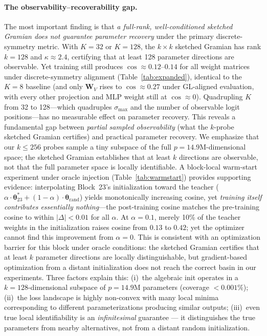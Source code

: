 \documentclass{article}
\newcommand{\btheta}{\boldsymbol{\theta}}
\newcommand{\bW}{\mathbf{W}}
\begin{document}
\paragraph{The observability--recoverability gap.}
The most important finding is that \emph{a full-rank, well-conditioned sketched Gramian does not guarantee parameter recovery} under the primary discrete-symmetry metric.  With $K{=}32$ or $K{=}128$, the $k \times k$ sketched Gramian has rank $k{=}128$ and $\kappa \approx 2.4$, certifying that at least 128 parameter directions are observable.  Yet training still produces $\cos \approx 0.12$--$0.14$ for all weight matrices under discrete-symmetry alignment (Table~\ref{tab:expanded}), identical to the $K{=}8$ baseline (and only $\bW_V$ rises to $\cos \approx 0.27$ under GL-aligned evaluation, with every other projection and MLP weight still at $\cos \approx 0$).  Quadrupling $K$ from 32 to 128---which quadruples $\sigma_{\max}$ and the number of observable logit positions---has no measurable effect on parameter recovery.  This reveals a fundamental gap between \emph{partial sampled observability} (what the $k$-probe sketched Gramian certifies) and practical parameter recovery.  We emphasize that our $k \leq 256$ probes sample a tiny subspace of the full $p = 14.9\text{M}$-dimensional space; the sketched Gramian establishes that at least $k$ directions are observable, not that the full parameter space is locally identifiable.  A block-local warm-start experiment under oracle injection (Table~\ref{tab:warmstart}) provides supporting evidence: interpolating Block~23's initialization toward the teacher ($\alpha \cdot \btheta^*_{23} + (1{-}\alpha) \cdot \btheta_{\text{rand}}$) yields monotonically increasing cosine, yet \emph{training itself contributes essentially nothing}---the post-training cosine matches the pre-training cosine to within $|\Delta| < 0.01$ for all $\alpha$.  At $\alpha{=}0.1$, merely 10\% of the teacher weights in the initialization raises cosine from $0.13$ to $0.42$; yet the optimizer cannot find this improvement from $\alpha{=}0$.  This is consistent with an optimization barrier for this block under oracle conditions: the sketched Gramian certifies that at least $k$ parameter directions are locally distinguishable, but gradient-based optimization from a distant initialization does not reach the correct basin in our experiments.  Three factors explain this: (i)~the algebraic init operates in a $k{=}128$-dimensional subspace of $p{=}14.9\text{M}$ parameters (coverage $< 0.001\%$); (ii)~the loss landscape is highly non-convex with many local minima corresponding to different parameterizations producing similar outputs; (iii)~even true local identifiability is an \emph{infinitesimal} guarantee --- it distinguishes the true parameters from nearby alternatives, not from a distant random initialization.
\end{document}
